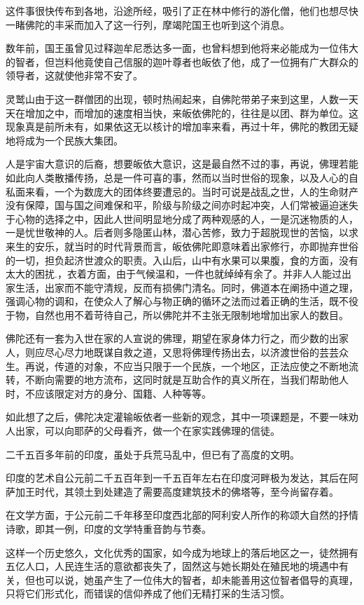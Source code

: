 \documentclass[12pt,twoside,openany]{book}
\begin{document}
这件事很快传布到各地，沿途所经，吸引了正在林中修行的游化僧，他们也想尽快一睹佛陀的丰采而加入了这一行列，摩竭陀国王也听到这个消息。

数年前，国王虽曾见过释迦牟尼悉达多一面，也曾料想到他将来必能成为一位伟大的智者，但岂料他竟使自己信服的迦叶尊者也皈依了他，成了一位拥有广大群众的领导者，这就使他非常不安了。

灵鹫山由于这一群僧团的出现，顿时热闹起来，自佛陀带弟子来到这里，人数一天天在增加之中，而增加的速度相当快，来皈依佛陀的，往往是以团、群为单位。这现象真是前所未有，如果依这无以核计的增加率来看，再过十年，佛陀的教团无疑地将成为一个民族大集团。

人是宇宙大意识的后裔，想要皈依大意识，这是最自然不过的事，再说，佛理若能如此向人类散播传扬，总是一件可喜的事，然而以当时世俗的现象，以及人心的自私面来看，一个为数庞大的团体终要遭忌的。当时可说是战乱之世，人的生命财产没有保障，国与国之间难保和平，阶级与阶级之间亦时起冲突，人们常被逼迫迷失于心物的选择之中，因此人世间明显地分成了两种观感的人，一是沉迷物质的人，一是忧世敬神的人。后者则多隐匿山林，潜心苦修，致力于超脱现世的苦恼，以求来生的安乐，就当时的时代背景而言，皈依佛陀即意味着出家修行，亦即抛弃世俗的一切，担负起济世渡众的职责。入山后，山中有水果可以果腹，食的方面，没有太大的困扰.，衣着方面，由于气候温和，一件也就绰绰有余了。并非人人能过出家生活，出家而不能守清规，反而有损佛门清名。同时，佛道本在阐扬中道之理，强调心物的调和，在使众人了解心与物正确的循环之法而过着正确的生活，既不役于物，自然也用不着苛待自己，所以佛陀并不主张无限制地增加出家人的数目。

佛陀还有一套为入世在家的人宣说的佛理，期望在家身体力行之，而少数的出家人，则应尽心尽力地既谋自救之道，又思将佛理传扬出去，以济渡世俗的芸芸众生。再说，传道的对象，不应当只限于一个民族，一个地区，正法应使之不断地流转，不断向需要的地方流布，这同时就是互助合作的真义所在，当我们帮助他人时，不应该限定对方的身分、国籍、人种等等。

如此想了之后，佛陀决定灌输皈依者一些新的观念，其中一项课题是，不要一味劝人出家，可以向耶萨的父母看齐，做一个在家实践佛理的信徒。

二千五百多年前的印度，虽处于兵荒马乱中，但已有了高度的文明。

印度的艺术自公元前二千五百年到一千五百年左右在印度河畔极为发达，其后在阿萨加王时代，其领土到处建造了需要高度建筑技术的佛塔等，至今尚留存着。

在文学方面，于公元前二千年移至印度西北部的阿利安人所作的称颂大自然的抒情诗歌，即其一例，印度的文学特重音韵与节奏。

这样一个历史悠久，文化优秀的国家，如今成为地球上的落后地区之一，徒然拥有五亿人口，人民连生活的意欲都丧失了，固然这与她长期处在殖民地的境遇中有关，但也可以说，她虽产生了一位伟大的智者，却未能善用这位智者倡导的真理，只将它们形式化，而错误的信仰养成了他们无精打采的生活习惯。
\end{document}
